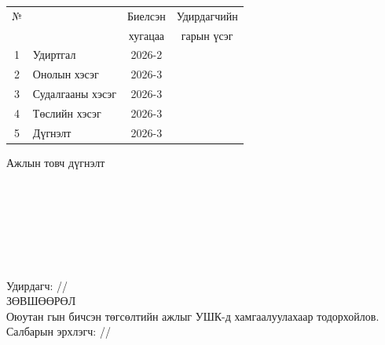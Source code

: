 \begin{titlepage}
\begin{center}
\begin{tabular}{|c|p{7cm}|c|c|}
	\hline
	№ & \makebox[7cm][c]{Хийж гүйцэтгэсэн ажил} & Биелсэн     & Удирдагчийн \\
	  &                    & хугацаа    & гарын үсэг \\ \hline
	1 & {Удиртгал}         & 2026-2 &  \\ \hline
	2 & {Онолын хэсэг}     & 2026-3 &  \\ \hline
	3 & {Судалгааны хэсэг} & 2026-3 &  \\ \hline
	4 & {Төслийн хэсэг}    & 2026-3 &  \\ \hline
	5 & {Дүгнэлт}          & 2026-3 &  \\ \hline
\end{tabular}

\vspace{1cm}
Ажлын товч дүгнэлт \\[0.5cm]
\dotfill \\[0.2cm]
\dotfill \\[0.2cm]
\dotfill \\[0.2cm]
\dotfill \\[0.2cm]
\dotfill \\[0.2cm]
\dotfill \\[0.2cm]
\dotfill \\[0.5cm]
Удирдагч: \makebox[3cm]{\dotfill} /\supname/ \\

\vspace{2cm}
ЗӨВШӨӨРӨЛ \\[0.5cm]
Оюутан \shortname гын бичсэн төгсөлтийн ажлыг УШК-д хамгаалуулахаар тодорхойлов.\\[0.5cm]
Салбарын эрхлэгч: \makebox[3cm]{\dotfill} /\chairname/
\end{center}

\end{titlepage}

\newpage

